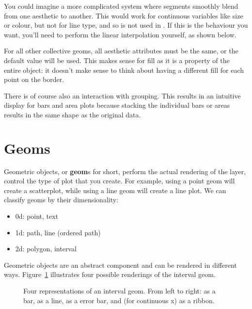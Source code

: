 You could imagine a more complicated system where segments smoothly blend from one aesthetic to another.  This would work for continuous variables like size or colour, but not for line type, and so is not used in \ggplot.  If this is the behaviour you want, you'll need to perform the linear interpolation yourself, as shown below.  

% 


For all other collective geoms, all aesthetic attributes must be the same, or the default value will be used.  This makes sense for fill as it is a property of the entire object: it doesn't make sense to think about having a different fill for each point on the border.

There is of course also an interaction with grouping.  This results in an intuitive display for bars and area plots because stacking the individual bars or areas results in the same shape as the original data.


\section{Geoms}
\label{sec:geom}

Geometric objects, or {\bf geom}s for short, perform the actual rendering of the layer, control the type of plot that you create.  For example, using a point geom will create a scatterplot, while using a line geom will create a line plot.  We can classify geoms by their dimensionality:

\begin{itemize}
  \item 0d: point, text
  \item 1d: path, line (ordered path)
  \item 2d: polygon, interval
\end{itemize}

Geometric objects are an abstract component and can be rendered in different ways. Figure~\ref{fig:interval} illustrates four possible renderings of the interval geom. 

\begin{figure}[htbp]
  \centering
  \caption{Four representations of an interval geom.  From left to right: as a bar, as a line, as a error bar, and (for continuous x) as a ribbon.}
  \label{fig:interval}
\end{figure}

